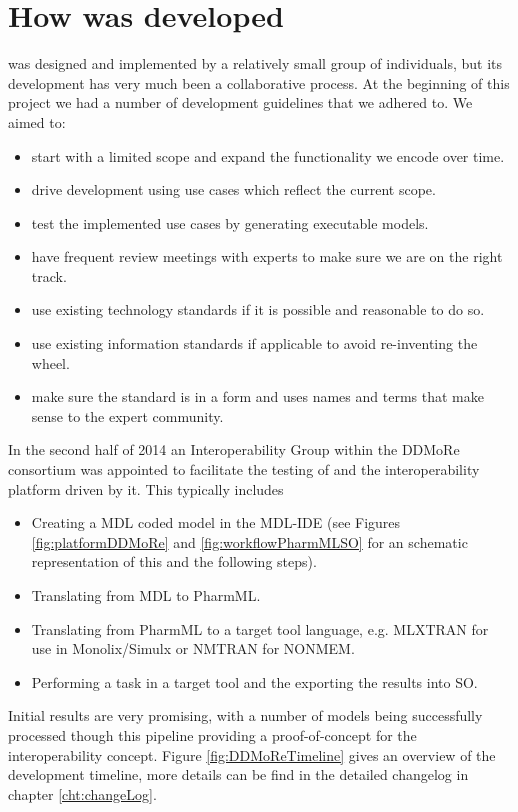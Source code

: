 \section{How \pharmml was developed}

\pharmml was designed and implemented by a relatively small group of individuals, 
but its development has very much been a collaborative process. At the beginning of 
this project we had a number of development guidelines that we adhered to. We aimed to:


\begin{itemize}
\item start with a limited scope and expand the functionality we encode over time.
\item drive development using use cases which reflect the current scope.
\item test the implemented use cases by generating executable models.
\item have frequent review meetings with experts to make sure we are on the right track.
\item use existing technology standards if it is possible and reasonable to do so.
\item use existing information standards if applicable to avoid re-inventing the wheel.
\item make sure the standard is in a form and uses names and terms that make sense to the expert community.
\end{itemize}

In the second half of 2014 an Interoperability Group within the DDMoRe consortium 
was appointed to facilitate the testing of \pml and the interoperability platform driven 
by it. This typically includes 
\begin{itemize}
\item
Creating a MDL coded model in the MDL-IDE (see Figures \ref{fig:platformDDMoRe} 
and \ref{fig:workflowPharmMLSO} for an schematic representation of this and 
the following steps).
\item
Translating from MDL to PharmML.
\item
Translating from PharmML to a target tool language, e.g. MLXTRAN for use in 
Monolix/Simulx or NMTRAN for NONMEM.
\item
Performing a task in a target tool and the exporting the results into SO.
\end{itemize}
Initial results are very promising, with a number of models being successfully processed 
though this pipeline providing a proof-of-concept for the interoperability concept. 
Figure \ref{fig:DDMoReTimeline} gives an overview of the development timeline, 
more details can be find in the detailed changelog in chapter \ref{cht:changeLog}.

